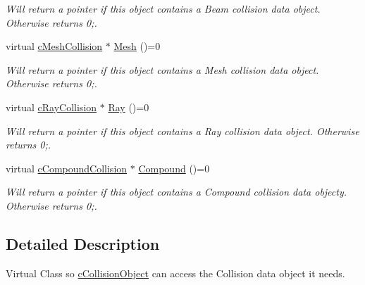 \begin{DoxyCompactItemize}
\begin{DoxyCompactList}\small\item\em Will return a pointer if this object contains a Beam collision data object. Otherwise returns 0;. \end{DoxyCompactList}\item 
\hypertarget{classv_collision_data_aa43965b2b0039ca5cb3398af7ae6dfd9}{
virtual \hyperlink{classc_mesh_collision}{cMeshCollision} $\ast$ \hyperlink{classv_collision_data_aa43965b2b0039ca5cb3398af7ae6dfd9}{Mesh} ()=0}
\label{classv_collision_data_aa43965b2b0039ca5cb3398af7ae6dfd9}

\begin{DoxyCompactList}\small\item\em Will return a pointer if this object contains a Mesh collision data object. Otherwise returns 0;. \end{DoxyCompactList}\item 
\hypertarget{classv_collision_data_a8de6432172be4bd0af5bb19f74db0cd1}{
virtual \hyperlink{classc_ray_collision}{cRayCollision} $\ast$ \hyperlink{classv_collision_data_a8de6432172be4bd0af5bb19f74db0cd1}{Ray} ()=0}
\label{classv_collision_data_a8de6432172be4bd0af5bb19f74db0cd1}

\begin{DoxyCompactList}\small\item\em Will return a pointer if this object contains a Ray collision data object. Otherwise returns 0;. \end{DoxyCompactList}\item 
\hypertarget{classv_collision_data_a6b50c5d7c4ff75b04a1c0d99fbb6eb25}{
virtual \hyperlink{classc_compound_collision}{cCompoundCollision} $\ast$ \hyperlink{classv_collision_data_a6b50c5d7c4ff75b04a1c0d99fbb6eb25}{Compound} ()=0}
\label{classv_collision_data_a6b50c5d7c4ff75b04a1c0d99fbb6eb25}

\begin{DoxyCompactList}\small\item\em Will return a pointer if this object contains a Compound collision data objecty. Otherwise returns 0;. \end{DoxyCompactList}\end{DoxyCompactItemize}


\subsection{Detailed Description}
Virtual Class so \hyperlink{classc_collision_object}{cCollisionObject} can access the Collision data object it needs. 